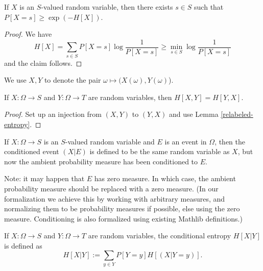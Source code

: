 \begin{lemma}\label{bound-conc}
  \leanok
  If $X$ is an $S$-valued random variable, then there exists $s \in S$ such that $P[X=s] \geq \exp(-H[X])$.
\end{lemma}

\begin{proof}
  We have
  $$ H[X] = \sum_{s \in S} P[X=s] \log \frac{1}{P[X=s]} \geq \min_{s \in S} \log \frac{1}{P[X=s]}$$
  and the claim follows.
\end{proof}

We use $X,Y$ to denote the pair $\omega \mapsto (X(\omega),Y(\omega)$).

\begin{lemma}
  \label{entropy-comm}
  \leanok
  If $X: \Omega \to S$ and $Y: \Omega \to T$ are random variables, then $H[X, Y] = H[Y, X]$.
\end{lemma}
\begin{proof}
  Set up an injection from $(X,Y)$ to $(Y,X)$ and use Lemma \ref{relabeled-entropy}.
\end{proof}


\begin{definition}
  \label{condition-event-def}
  \leanok
  If $X: \Omega \to S$ is an $S$-valued random variable and $E$ is an event in $\Omega$, then the conditioned event $(X|E)$ is defined to be the same random variable as $X$, but now the ambient probability measure has been conditioned to $E$.
\end{definition}

Note: it may happen that $E$ has zero measure.  In which case, the ambient probability measure should be replaced with a zero measure.  (In our formalization we achieve this by working with arbitrary measures, and normalizing them to be probability measures if possible, else using the zero measure.  Conditioning is also formalized using existing Mathlib definitions.)

\begin{definition}
  \label{conditional-entropy-def}
  \leanok
  If $X: \Omega \to S$ and $Y: \Omega \to T$ are random variables, the conditional entropy $H[X|Y]$ is defined as
  $$ H[X|Y] := \sum_{y \in Y} P[Y = y] H[(X | Y=y)].$$
\end{definition}

